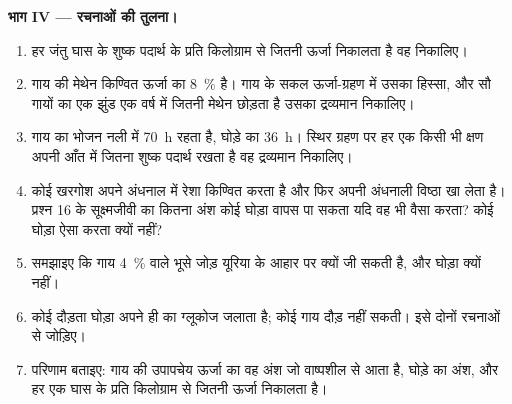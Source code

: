 \begin{problem}
\medskip
\noindent\textbf{भाग IV --- रचनाओं की तुलना।}
\begin{enumerate}[resume]
  \item हर जंतु घास के शुष्क पदार्थ के प्रति किलोग्राम से जितनी ऊर्जा
        निकालता है वह निकालिए।
  \item गाय की मेथेन किण्वित ऊर्जा का \qty{8}{\%} है। गाय के सकल
        ऊर्जा-ग्रहण में उसका हिस्सा, और सौ गायों का एक झुंड एक वर्ष में
        जितनी मेथेन छोड़ता है उसका द्रव्यमान निकालिए।
  \item गाय का भोजन नली में \qty{70}{h} रहता है, घोड़े का \qty{36}{h}।
        स्थिर ग्रहण पर हर एक किसी भी क्षण अपनी आँत में जितना शुष्क
        पदार्थ रखता है वह द्रव्यमान निकालिए।
  \item कोई खरगोश अपने अंधनाल में रेशा किण्वित करता है और फिर अपनी
        अंधनाली विष्ठा खा लेता है। प्रश्न 16 के सूक्ष्मजीवी  का
        कितना अंश कोई घोड़ा वापस पा सकता यदि वह भी वैसा करता? कोई
        घोड़ा ऐसा करता क्यों नहीं?
  \item समझाइए कि गाय \qty{4}{\%}  वाले भूसे जोड़ यूरिया के आहार
        पर क्यों जी सकती है, और घोड़ा क्यों नहीं।
  \item कोई दौड़ता घोड़ा अपने ही  का ग्लूकोज जलाता है; कोई गाय
        दौड़ नहीं सकती। इसे दोनों रचनाओं से जोड़िए।
  \item परिणाम बताइए: गाय की उपापचेय ऊर्जा का वह अंश जो वाष्पशील  से आता है, घोड़े का अंश, और हर एक घास के प्रति किलोग्राम
        से जितनी ऊर्जा निकालता है।
\end{enumerate}
\end{problem}
